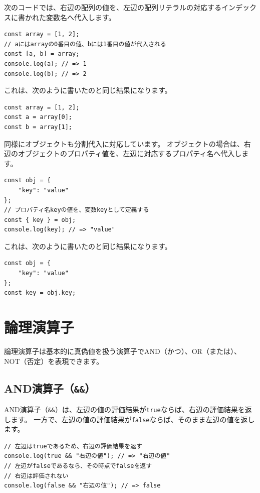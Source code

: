 次のコードでは、右辺の配列の値を、左辺の配列リテラルの対応するインデックスに書かれた変数名へ代入します。

\begin{lstlisting}
const array = [1, 2];
// aにはarrayの0番目の値、bには1番目の値が代入される
const [a, b] = array;
console.log(a); // => 1
console.log(b); // => 2
\end{lstlisting}

これは、次のように書いたのと同じ結果になります。

\begin{lstlisting}
const array = [1, 2];
const a = array[0];
const b = array[1];
\end{lstlisting}

同様にオブジェクトも分割代入に対応しています。
オブジェクトの場合は、右辺のオブジェクトのプロパティ値を、左辺に対応するプロパティ名へ代入します。

\begin{lstlisting}
const obj = {
    "key": "value"
};
// プロパティ名keyの値を、変数keyとして定義する
const { key } = obj;
console.log(key); // => "value"
\end{lstlisting}

これは、次のように書いたのと同じ結果になります。

\begin{lstlisting}
const obj = {
    "key": "value"
};
const key = obj.key;
\end{lstlisting}

\hypertarget{logical-operator}{%
\section{論理演算子}\label{logical-operator}}

論理演算子は基本的に真偽値を扱う演算子でAND（かつ）、OR（または）、NOT（否定）を表現できます。

\hypertarget{and-operator}{%
\subsection{AND演算子（\texttt{\&\&}）}\label{and-operator}}

AND演算子（\texttt{\&\&}）は、左辺の値の評価結果が\texttt{true}ならば、右辺の評価結果を返します。
一方で、左辺の値の評価結果が\texttt{false}ならば、そのまま左辺の値を返します。

\begin{lstlisting}
// 左辺はtrueであるため、右辺の評価結果を返す
console.log(true && "右辺の値"); // => "右辺の値"
// 左辺がfalseであるなら、その時点でfalseを返す
// 右辺は評価されない
console.log(false && "右辺の値"); // => false
\end{lstlisting}


